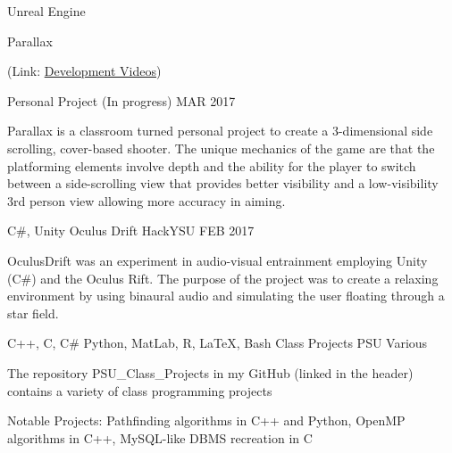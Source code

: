 
\begin{cventries}
	\cventry
	{{\color{awesome} Unreal Engine}} %
	{Parallax \begin{footnotesize}{(Link: \href{https://www.youtube.com/playlist?list=PLJCbmN5AjE1XUlgY5KwFnwDh3gmhvtiSC}{\color{awesome}\underline{Development Videos}})}\end{footnotesize}} %
	{Personal Project (In progress)} %
	{MAR 2017} %
	{
		\begin{cvitems} %
			\item {Parallax is a classroom turned personal project to create a 3-dimensional side scrolling, cover-based shooter. The unique mechanics of the game are that the platforming elements involve depth and the ability for the player to switch between a side-scrolling view that provides better visibility and a low-visibility 3rd person view allowing more accuracy in aiming.}
		\end{cvitems}
	}
	\cventry
	{{\color{awesome} C\#, Unity}} %
	{Oculus Drift} %
	{HackYSU} %
	{FEB 2017} %
	{
		\begin{cvitems} %
			\item {OculusDrift was an experiment in audio-visual entrainment employing Unity (C\#) and the Oculus Rift. The purpose of the project was to create a relaxing environment by using binaural audio and simulating the user floating through a star field.}
		\end{cvitems}
	}
	\cventry
	{{\color{awesome} C++, C, C\# Python, MatLab, R, LaTeX, Bash}} %
	{Class Projects} %
	{PSU} %
	{Various} %
	{
	\begin{cvitems} %
		\item {The repository PSU\_Class\_Projects in my GitHub (linked in the header) contains a variety of class programming projects 
		\item Notable Projects: Pathfinding algorithms in C++ and Python, OpenMP algorithms in C++, MySQL-like DBMS recreation in C}
	\end{cvitems}
	}
\end{cventries}